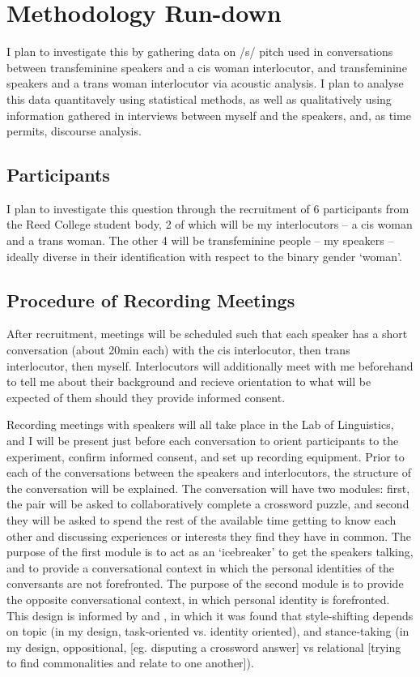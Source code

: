 \documentclass[11pt]{article}
\begin{document}
\section{Methodology Run-down}
I plan to investigate this by gathering data on /s/ pitch used in conversations between transfeminine speakers and a cis woman interlocutor, and transfeminine speakers and a trans woman interlocutor via acoustic analysis. I plan to analyse this data quantitavely using statistical methods, as well as qualitatively using information gathered in interviews between myself and the speakers, and, as time permits, discourse analysis.

\subsection{Participants}
I plan to investigate this question through the recruitment of 6 participants from the Reed College student body, 2 of which will be my  interlocutors -- a cis woman and a trans woman. The other 4 will be transfeminine people -- my speakers -- ideally diverse in their identification with respect to the binary gender `woman'.

\subsection{Procedure of Recording Meetings}
After recruitment, meetings will be scheduled such that each speaker has a short conversation (about 20min each) with the cis interlocutor, then trans interlocutor, then myself. Interlocutors will  additionally meet with me beforehand to tell me about their background and recieve orientation to what will be expected of them should they provide informed consent. 

Recording meetings with speakers will all take place in the Lab of Linguistics, and I will be present just before each conversation to orient participants to the experiment, confirm informed consent, and set up recording equipment. Prior to each of the conversations between the speakers and interlocutors, the structure of the conversation will be explained. The conversation will have two modules: first, the pair will be asked to collaboratively complete a crossword puzzle, and second they will be asked to spend the rest of the available time getting to know each other and discussing experiences or interests they find they have in common. The purpose of the first module is to act as an `icebreaker' to get the speakers talking, and to provide a conversational context in which the personal identities of the conversants are not forefronted. The purpose of the second module is to provide the opposite conversational context, in which personal identity is forefronted. This design is informed by \textcite{holmes-elliott_substance_2017} and \textcite{rickford_addressee_1994}, in which it was found that style-shifting depends on topic (in my design, task-oriented vs. identity oriented), and stance-taking (in my design, oppositional, [eg. disputing a crossword answer] vs relational [trying to find commonalities and relate to one another]). 
\end{document}
